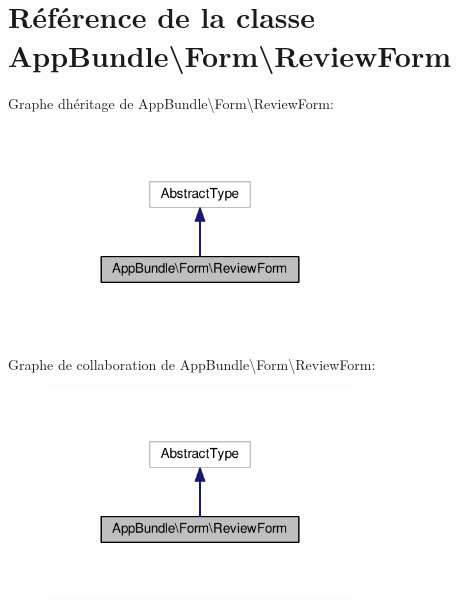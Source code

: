\hypertarget{classAppBundle_1_1Form_1_1ReviewForm}{}\section{Référence de la classe App\+Bundle\textbackslash{}Form\textbackslash{}Review\+Form}
\label{classAppBundle_1_1Form_1_1ReviewForm}


Graphe d\textquotesingle{}héritage de App\+Bundle\textbackslash{}Form\textbackslash{}Review\+Form\+:\nopagebreak
\begin{figure}[H]
\begin{center}
\leavevmode
\includegraphics[width=228pt]{classAppBundle_1_1Form_1_1ReviewForm__inherit__graph}
\end{center}
\end{figure}


Graphe de collaboration de App\+Bundle\textbackslash{}Form\textbackslash{}Review\+Form\+:\nopagebreak
\begin{figure}[H]
\begin{center}
\leavevmode
\includegraphics[width=228pt]{classAppBundle_1_1Form_1_1ReviewForm__coll__graph}
\end{center}
\end{figure}
